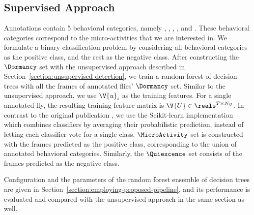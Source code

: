 \subsection{Supervised Approach}\label{section:supervised-detection}
Annotations contain 5 behavioral categories, namely \Grooming, \PosturalAdjustment, \ProboscisPumping, \HaltereSwitch, and \Feeding.
These behavioral categories correspond to the micro-activities that we are interested in.
We formulate a binary classification problem by considering all behavioral categories as the positive class, and the rest as the negative class.
After constructing the $\Dormancy$ set with the unsupervised approach described in Section~\ref{section:unsupervised-detection}, we train a random forest of decision trees \citep{breiman_random_2001} with all the frames of annotated flies' $\Dormancy$ set.
Similar to the unsupervised approach, we use $\V{u}_i$ as the training features.
For a single annotated fly, the resulting training feature matrix is $\V{U} \in \reals^{T \times N_G}$.
In contrast to the original publication \citep{breiman_random_2001}, we use the Scikit-learn \citep{pedregosa_scikit-learn_2011} implementation which combines classifiers by averaging their probabilistic prediction, instead of letting each classifier vote for a single class.
$\MicroActivity$ set is constructed with the frames predicted as the positive class, corresponding to the union of annotated behavioral categories. Similarly, the $\Quiescence$ set consists of the frames predicted as the negative class.

Configuration and the parameters of the random forest ensemble of decision trees are given in Section~\ref{section:employing-proposed-pipeline}, and its performance is evaluated and compared with the unsupervised approach in the same section as well.